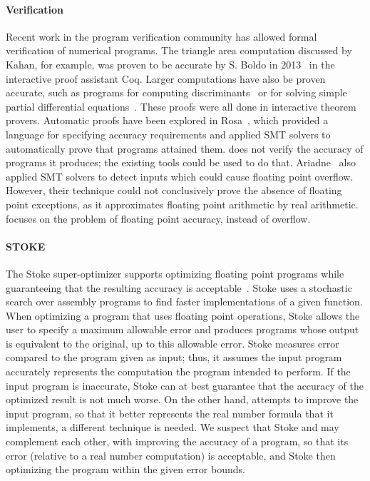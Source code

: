 \documentclass[paper.tex]{subfiles}
\begin{document}
\paragraph{Verification}
Recent work in the program verification community
  has allowed formal verification of numerical programs.
The triangle area computation discussed by Kahan, for example,
  was proven to be accurate by S. Boldo in 2013~\cite{arith13-area-triangle}
  in the interactive proof assistant Coq.
Larger computations have also be proven accurate,
  such as programs for computing discriminants~\cite{ieee09-discriminant-proven}
  or for solving simple partial differential equations~\cite{jar13-wave-equation-prove}.
These proofs were all done in interactive theorem provers.
Automatic proofs have been explored in Rosa~\cite{popl14-rosa},
  which provided a language for specifying accuracy requirements
  and applied SMT solvers to automatically prove
  that programs attained them.
\casio does not verify the accuracy of programs it produces;
  the existing tools could be used to do that.
Ariadne~\cite{popl13-ariadne} also applied SMT solvers
  to detect inputs which could cause floating point overflow.
However, their technique could not conclusively prove
  the absence of floating point exceptions,
  as it approximates floating point arithmetic by real arithmetic.
\casio focuses on the problem of floating point accuracy,
  instead of overflow.

\paragraph{STOKE}
The Stoke super-optimizer supports
  optimizing floating point programs while guaranteeing
  that the resulting accuracy is acceptable~\cite{pldi14-stoke}.
Stoke uses a stochastic search over assembly programs
  to find faster implementations of a given function.
When optimizing a program that uses floating point operations,
  Stoke allows the user to specify a maximum allowable error
  and produces programs whose output is equivalent to the original,
  up to this allowable error.
Stoke measures error compared to the program given as input;
  thus, it assumes the input program accurately represents
  the computation the program intended to perform.
If the input program is inaccurate, Stoke can at best guarantee
  that the accuracy of the optimized result is not much worse.
On the other hand, \casio attempts to improve the input program,
  so that it better represents
  the real number formula that it implements,
  a different technique is needed.
We suspect that Stoke and \casio may complement each other,
  with \casio improving the accuracy of a program,
  so that its error (relative to a real number computation) is acceptable,
  and Stoke then optimizing the program within the given error bounds.
\end{document}
